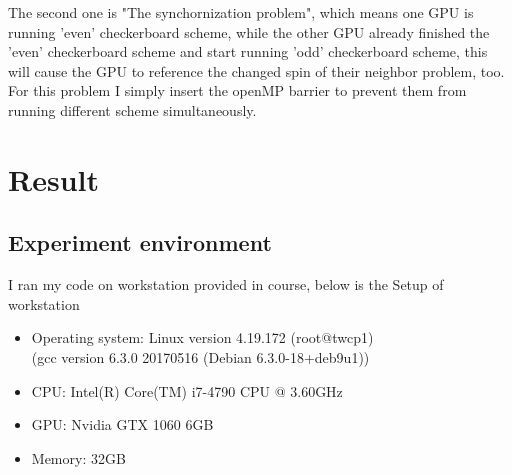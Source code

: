\documentclass{article}
\begin{document}
	The second one is "The synchornization problem", which means one GPU is running 'even' checkerboard scheme, while the other GPU already finished the 'even' checkerboard scheme and start running 'odd' checkerboard scheme, this will cause the GPU to reference the changed spin of their neighbor problem, too. For this problem I simply insert the openMP barrier to prevent them from running different scheme simultaneously.

	\section{Result}
	\subsection{Experiment environment}
	I ran my code on workstation provided in course, below is the Setup of workstation
	\begin{itemize}
		\item Operating system: Linux version 4.19.172 (root@twcp1)\\(gcc version 6.3.0 20170516 (Debian 6.3.0-18+deb9u1))
		\item CPU: Intel(R) Core(TM) i7-4790 CPU @ 3.60GHz
		\item GPU: Nvidia GTX 1060 6GB
		\item Memory: 32GB 
	\end{itemize}
\end{document}
